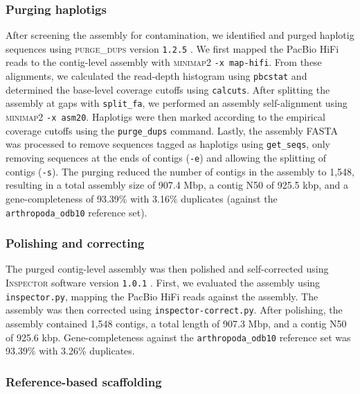 \documentclass[11pt]{article}
\begin{document}
\subsubsection*{Purging haplotigs}

After screening the assembly for contamination, we identified and purged haplotig
sequences using \textsc{purge\_dups} version \texttt{1.2.5}
\citep{guan_identifying_2020}.
We first mapped the PacBio HiFi reads to the contig-level assembly with
\textsc{minimap2} \texttt{-x map-hifi}.
From these alignments, we calculated the read-depth histogram using \texttt{pbcstat}
and determined the base-level coverage cutoffs using \texttt{calcuts}.
After splitting the assembly at gaps with \texttt{split\_fa}, we performed an
assembly self-alignment using \textsc{minimap2} \texttt{-x asm20}.
Haplotigs were then marked according to the empirical coverage cutoffs using the
\texttt{purge\_dups} command.
Lastly, the assembly FASTA was processed to remove sequences tagged as haplotigs using
\texttt{get\_seqs}, only removing sequences at the ends of contigs (\texttt{-e}) and
allowing the splitting of contigs (\texttt{-s}).
The purging reduced the number of contigs in the assembly to 1,548, resulting in
a total assembly size of 907.4 Mbp, a contig N50 of 925.5 kbp, and a gene-completeness
of 93.39\% with 3.16\% duplicates (against the \texttt{arthropoda\_odb10} reference
set).

\subsubsection*{Polishing and correcting}

The purged contig-level assembly was then polished and self-corrected using
\textsc{Inspector} software version \texttt{1.0.1} \citep{chen_accurate_2021}.
First, we evaluated the assembly using \texttt{inspector.py}, mapping the PacBio HiFi
reads against the assembly.
The assembly was then corrected using \texttt{inspector-correct.py}.
After polishing, the assembly contained 1,548 contigs, a total length of 907.3 Mbp,
and a contig N50 of 925.6 kbp.
Gene-completeness against the \texttt{arthropoda\_odb10} reference set was 93.39\%
with 3.26\% duplicates.

\subsubsection*{Reference-based scaffolding}
\end{document}
